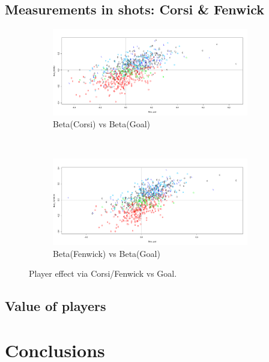 \subsection{Measurements in shots: Corsi \& Fenwick}
\label{sec:corsifenwick}
\begin{figure}[t!]
	\centering
	\begin{subfigure}[t]{0.5\textwidth}
		\centering
		\includegraphics[height=1.5in]{figures/corsivsgoals.pdf}
		\caption{Beta(Corsi) vs Beta(Goal)}
	\end{subfigure}%
	~ 
	\begin{subfigure}[t]{0.5\textwidth}
		\centering
		\includegraphics[height=1.5in]{figures/fenwickvsgoals.pdf}
		\caption{Beta(Fenwick) vs Beta(Goal)}
	\end{subfigure}
	\caption{Player effect via Corsi/Fenwick vs Goal.}
\end{figure}



\subsection{Value of players}
\label{sec:salary}




\section{Conclusions}
\label{sec:conclude}


